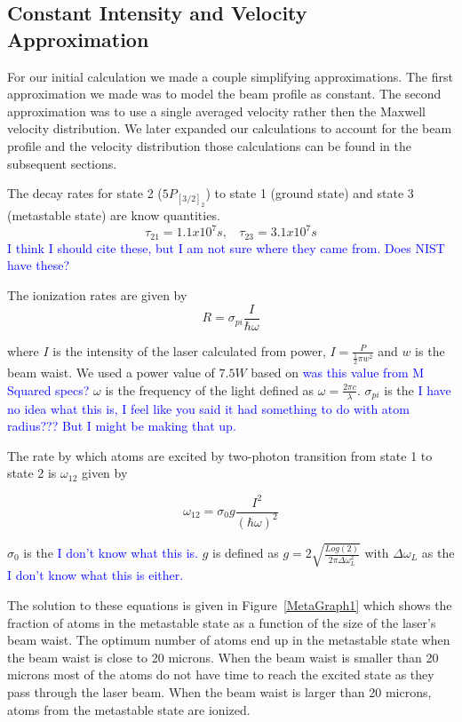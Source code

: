 \documentclass[prb,preprint]{revtex4-1}
\begin{document}
\subsection{Constant Intensity and Velocity Approximation} 

For our initial calculation we made a couple simplifying approximations. The first approximation we made was to model the beam profile as constant. The second approximation was to use a single averaged velocity rather then the Maxwell velocity distribution. We later expanded our calculations to account for the beam profile and the velocity distribution those calculations can be found in the subsequent sections. 

The decay rates for state 2 ($5P_{[3/2]_2}$) to state 1 (ground state) and state 3 (metastable state) are know quantities.
\begin{equation}
\label{DecayRates} 
\tau_{21} = 1.1x10^7 s, \	\	\	\	 \tau_{23} = 3.1x10^7s
\end{equation} 
\textcolor{blue}{I think I should cite these, but I am not sure where they came from. Does NIST have these?}

The ionization rates are given by 
\begin{equation}
\label{IonizationRates}
R = \sigma_{pi} \frac{I}{\hbar\omega}
\end{equation}

where $I$ is the intensity of the laser calculated from power, $I = \frac{P}{\frac{1}{2}\pi w^2}$ and $w$ is the beam waist. We used a power value of $7.5 W$ based on \textcolor{blue}{was this value from M Squared specs?} $\omega$ is the frequency of the light defined as $\omega = \frac{2\pi c}{\lambda}$. $\sigma_{pi}$ is the \textcolor{blue}{I have no idea what this is, I feel like you said it had something to do with atom radius??? But I might be making that up.} 

The rate by which atoms are excited by two-photon transition from state 1 to state 2 is $\omega_{12}$ given by

\begin{equation}
\label{ExcitationRate}
\omega_{12} = \sigma_0 g \frac{I^2}{(\hbar \omega)^2}
\end{equation}

$\sigma_0$ is the \textcolor{blue}{I don't know what this is.} $g$ is defined as $g = 2 \sqrt{\frac{Log(2)}{2 \pi \Delta \omega_L^2}}$ with $\Delta\omega_L$ as the \textcolor{blue}{I don't know what this is either.}

The solution to these equations is given in Figure~\ref{MetaGraph1} which shows the fraction of atoms in the metastable state as a function of the size of the laser's beam waist. The optimum number of atoms end up in the metastable state when the beam waist is close to 20 microns. When the beam waist is smaller than 20 microns most of the atoms do not have time to reach the excited state as they pass through the laser beam. When the beam waist is larger than 20 microns, atoms from the metastable state are ionized.
\end{document}
